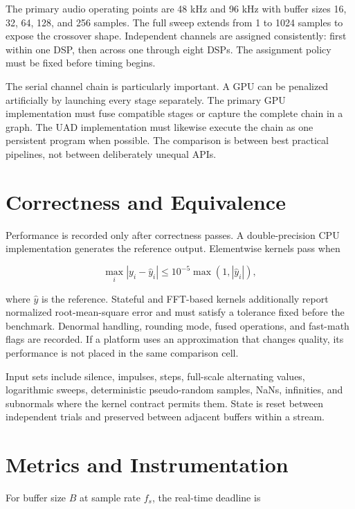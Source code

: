 \documentclass[10pt,twocolumn,twoside]{article}
\begin{document}
The primary audio operating points are 48 kHz and 96 kHz with buffer sizes
16, 32, 64, 128, and 256 samples. The full sweep extends from 1 to 1024 samples
to expose the crossover shape. Independent channels are assigned consistently:
first within one DSP, then across one through eight DSPs. The assignment policy
must be fixed before timing begins.

The serial channel chain is particularly important. A GPU can be penalized
artificially by launching every stage separately. The primary GPU
implementation must fuse compatible stages or capture the complete chain in a
graph. The UAD implementation must likewise execute the chain as one persistent
program when possible. The comparison is between best practical pipelines, not
between deliberately unequal APIs.

\section{Correctness and Equivalence}

Performance is recorded only after correctness passes. A double-precision CPU
implementation generates the reference output. Elementwise kernels pass when

\begin{equation}
  \max_i |y_i-\hat{y}_i| \le 10^{-5}\max(1,|\hat{y}_i|),
\end{equation}

where $\hat{y}$ is the reference. Stateful and FFT-based kernels additionally
report normalized root-mean-square error and must satisfy a tolerance fixed
before the benchmark. Denormal handling, rounding mode, fused operations, and
fast-math flags are recorded. If a platform uses an approximation that changes
quality, its performance is not placed in the same comparison cell.

Input sets include silence, impulses, steps, full-scale alternating values,
logarithmic sweeps, deterministic pseudo-random samples, NaNs, infinities, and
subnormals where the kernel contract permits them. State is reset between
independent trials and preserved between adjacent buffers within a stream.

\section{Metrics and Instrumentation}

For buffer size $B$ at sample rate $f_s$, the real-time deadline is
\end{document}
